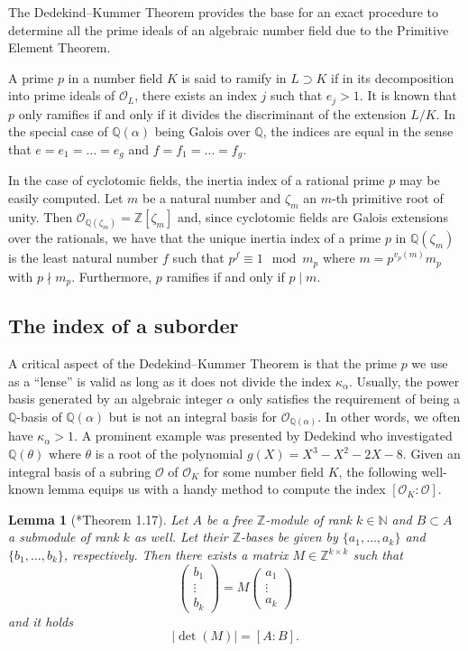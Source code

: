 \documentclass[a4paper, 11pt, reqno]{amsart}
\theoremstyle{plain}
\newtheorem{lemma}[thm]{Lemma}
\theoremstyle{definition}
\theoremstyle{remark}
\numberwithin{equation}{section}
\newcommand{\Z}{\mathbb{Z}}
\newcommand{\Q}{\mathbb{Q}}
\newcommand{\N}{\mathbb{N}}
\begin{document}
The Dedekind--Kummer Theorem provides the base for an exact procedure to determine all the prime ideals of an algebraic number field due to the Primitive Element Theorem.

A prime $p$ in a number field $K$ is said to ramify in $L \supset K$ if in its decomposition into prime ideals of $\mathcal{O}_L$, there exists an index $j$ such that $e_j > 1$. It is known that $p$ only ramifies if and only if it divides the discriminant of the extension $L/K$. In the special case of $\Q(\alpha)$ being Galois over $\Q$, the indices are equal in the sense that $e = e_1 = \ldots = e_g$ and $f = f_1 = \ldots = f_g$.

In the case of cyclotomic fields, the inertia index of a rational prime $p$ may be easily computed. Let $m$ be a natural number and $\zeta_m$ an $m$-th primitive root of unity. Then $\mathcal{O}_{\Q(\zeta_m)} = \Z[\zeta_m]$ and, since cyclotomic fields are Galois extensions over the rationals, we have that the unique inertia index of a prime $p$ in $\Q(\zeta_m)$ is the least natural number $f$ such that $p^f \equiv 1 \mod m_p$ where $m = p^{v_p(m)}m_p$ with $p \nmid m_p$. Furthermore, $p$ ramifies if and only if $p \mid m$.

\subsection{The index of a suborder} 

A critical aspect of the Dedekind--Kummer Theorem is that the prime $p$ we use as a ``lense'' is valid as long as it does not divide the index $\kappa_\alpha$. Usually, the power basis generated by an algebraic integer $\alpha$ only satisfies the requirement of being a $\Q$-basis of $\Q(\alpha)$ but is not an integral basis for $\mathcal{O}_{\Q(\alpha)}$. In other words, we often have $\kappa_\alpha > 1$. A prominent example was presented by Dedekind who investigated $\Q(\theta)$ where $\theta$ is a root of the polynomial $g(X) = X^3 - X^2 - 2X - 8$. Given an integral basis of a subring $\mathcal{O}$ of $\mathcal{O}_K$ for some number field $K$, the following well-known lemma equips us with a handy method to compute the index $[\mathcal{O}_K : \mathcal{O}]$.

\begin{lemma}[\cite{SteTall}*{Theorem 1.17}] \label{lem:IndexIsDetOfMatrix}
    Let $A$ be a free $\Z$-module of rank $k \in \N$ and $B \subset A$ a submodule of rank $k$ as well. Let their $\Z$-bases be given by $\{a_1, \ldots, a_k\}$ and $\{b_1, \ldots, b_k\}$, respectively. Then there exists a matrix $M \in \Z^{k \times k}$ such that
    \[\begin{pmatrix}
        b_1\\
        \vdots\\
        b_k
    \end{pmatrix} = M \begin{pmatrix}
        a_1\\
        \vdots\\
        a_k
    \end{pmatrix}\]
    and it holds
    \[|\det(M)| = [A : B].\]
\end{lemma}
\end{document}
